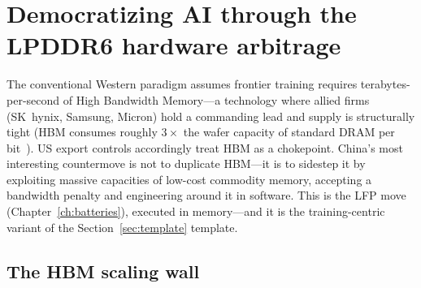 \section{Democratizing AI through the LPDDR6 hardware arbitrage}
\label{sec:lpddr6}

The conventional Western paradigm assumes frontier training requires terabytes-per-second of High Bandwidth Memory---a technology where allied firms (SK~hynix, Samsung, Micron) hold a commanding lead and supply is structurally tight (HBM consumes roughly $3\times$ the wafer capacity of standard DRAM per bit~\cite{hbm-wafer}). US export controls accordingly treat HBM as a chokepoint. China's most interesting countermove is not to duplicate HBM---it is to sidestep it by exploiting massive capacities of low-cost commodity memory, accepting a bandwidth penalty and engineering around it in software. This is the LFP move (Chapter~\ref{ch:batteries}), executed in memory---and it is the training-centric variant of the Section~\ref{sec:template} template.

\subsection{The HBM scaling wall}

